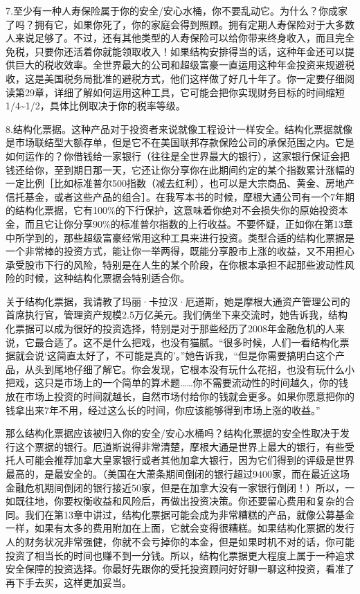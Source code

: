 7.至少有一种人寿保险属于你的安全/安心水桶，你不要乱动它。为什么？你成家了吗？拥有它，如果你死了，你的家庭会得到照顾。拥有定期人寿保险对于大多数人来说足够了。不过，还有其他类型的人寿保险可以给你带来终身收入，而且完全免税，只要你还活着你就能领取收入！如果结构安排得当的话，这种年金还可以提供巨大的税收效率。全世界最大的公司和超级富豪一直运用这种年金投资来规避税收，这是美国税务局批准的避税方式，他们这样做了好几十年了。你一定要仔细阅读第29章，详细了解如何运用这种工具，它可能会把你实现财务目标的时间缩短1/4\textasciitilde{}1/2，具体比例取决于你的税率等级。

8.结构化票据。这种产品对于投资者来说就像工程设计一样安全。结构化票据就像是市场联结型大额存单，但是它不在美国联邦存款保险公司的承保范围之内。它是如何运作的？你借钱给一家银行（往往是全世界最大的银行），这家银行保证会把钱还给你，至到期日那一天，它还让你分享你在此期间约定的某个指数累计涨幅的一定比例［比如标准普尔500指数（减去红利），也可以是大宗商品、黄金、房地产信托基金，或者这些产品的组合］。在我写本书的时候，摩根大通公司有一个7年期的结构化票据，它有100\%的下行保护，这意味着你绝对不会损失你的原始投资本金，而且它让你分享90\%的标准普尔指数的上行收益。不要怀疑，正如你在第13章中所学到的，那些超级富豪经常用这种工具来进行投资。类型合适的结构化票据是一个非常棒的投资方式，能让你一举两得，既能分享股市上涨的收益，又不用担心承受股市下行的风险，特别是在人生的某个阶段，在你根本承担不起那些波动性风险的时候，这种结构化票据会特别适合你。

关于结构化票据，我请教了玛丽·卡拉汉·厄道斯，她是摩根大通资产管理公司的首席执行官，管理资产规模2.5万亿美元。我们俩坐下来交流时，她告诉我，结构化票据可以成为很好的投资选择，特别是对于那些经历了2008年金融危机的人来说，它最合适了。这不是什么把戏，也没有猫腻。“很多时候，人们一看结构化票据就会说‘这简直太好了，不可能是真的’。”她告诉我，“但是你需要搞明白这个产品，从头到尾地仔细了解它。你会发现，它根本没有玩什么花招，也没有玩什么小把戏，这只是市场上的一个简单的算术题……你不需要流动性的时间越久，你的钱放在市场上投资的时间就越长，自然市场付给你的钱就会更多。如果你愿意把你的钱拿出来7年不用，经过这么长的时间，你应该能够得到市场上涨的收益。”

那么结构化票据应该被归入你的安全/安心水桶吗？结构化票据的安全性取决于发行这个票据的银行。厄道斯说得非常清楚，摩根大通是世界上最大的银行，有些受托人可能会推荐加拿大皇家银行或者其他加拿大银行，因为它们得到的评级是世界最高的，是最安全的。（美国在大萧条期间倒闭的银行超过9400家，而在最近这场金融危机期间倒闭的银行接近50家，但是在加拿大没有一家银行倒闭！）所以，一如既往地，你要权衡收益和风险后，再做出投资决策。你还要留心费用和复杂的合同。我们在第13章中讲过，结构化票据可能会成为非常糟糕的产品，就像公募基金一样，如果有太多的费用附加在上面，它就会变得很糟糕。如果结构化票据的发行人的财务状况非常强健，你就不会亏掉你的本金，但是如果时机不对的话，你可能投资了相当长的时间也赚不到一分钱。所以，结构化票据更大程度上属于一种追求安全保障的投资选择。你最好先跟你的受托投资顾问好好聊一聊这种投资，看准了再下手去买，这样更加妥当。

